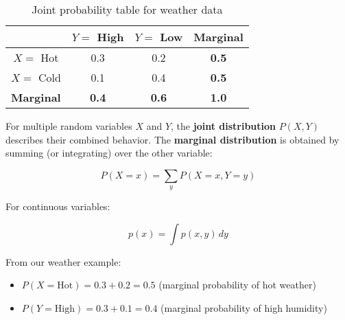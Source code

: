 \begin{table}[h]
\centering
\begin{tabular}{|c|c|c|c|}
\hline
 & $Y=$ High & $Y=$ Low & \textbf{Marginal} \\
\hline
$X=$ Hot & 0.3 & 0.2 & \textbf{0.5} \\
$X=$ Cold & 0.1 & 0.4 & \textbf{0.5} \\
\hline
\textbf{Marginal} & \textbf{0.4} & \textbf{0.6} & \textbf{1.0} \\
\hline
\end{tabular}
\caption{Joint probability table for weather data}
\label{tab:weather-joint}
\end{table}

For multiple random variables $X$ and $Y$, the \textbf{joint distribution} $P(X, Y)$ describes their combined behavior. The \textbf{marginal distribution} is obtained by summing (or integrating) over the other variable:

\begin{equation}
P(X=x) = \sum_{y} P(X=x, Y=y)
\end{equation}

For continuous variables:

\begin{equation}
p(x) = \int p(x, y) \, dy
\end{equation}

From our weather example:
\begin{itemize}
    \item $P(X=\text{Hot}) = 0.3 + 0.2 = 0.5$ (marginal probability of hot weather)
    \item $P(Y=\text{High}) = 0.3 + 0.1 = 0.4$ (marginal probability of high humidity)
\end{itemize}
